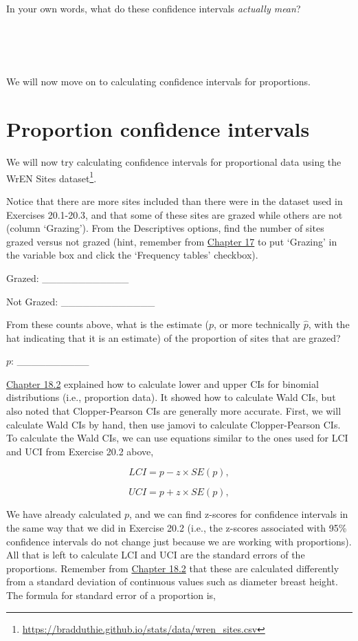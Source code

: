 \documentclass[
  openany]{scrbook}
\begin{document}
In your own words, what do these confidence intervals \emph{actually mean}?

\begin{verbatim}




\end{verbatim}

We will now move on to calculating confidence intervals for proportions.

\hypertarget{proportion-confidence-intervals}{%
\section{Proportion confidence intervals}\label{proportion-confidence-intervals}}

We will now try calculating confidence intervals for proportional data using the WrEN Sites dataset\footnote{\url{https://bradduthie.github.io/stats/data/wren_sites.csv}}.

Notice that there are more sites included than there were in the dataset used in Exercises 20.1-20.3, and that some of these sites are grazed while others are not (column `Grazing').
From the Descriptives options, find the number of sites grazed versus not grazed (hint, remember from \protect\hyperlink{Chapter_17}{Chapter 17} to put `Grazing' in the variable box and click the `Frequency tables' checkbox).

Grazed: \_\_\_\_\_\_\_\_\_\_\_\_

Not Grazed: \_\_\_\_\_\_\_\_\_\_\_\_\_

From these counts above, what is the estimate (\(p\), or more technically \(\hat{p}\), with the hat indicating that it is an estimate) of the proportion of sites that are grazed?

\(p\): \_\_\_\_\_\_\_\_\_\_

\href{Chapter_18.html\#binomial-distribution-cis}{Chapter 18.2} explained how to calculate lower and upper CIs for binomial distributions (i.e., proportion data).
It showed how to calculate Wald CIs, but also noted that Clopper-Pearson CIs are generally more accurate.
First, we will calculate Wald CIs by hand, then use jamovi to calculate Clopper-Pearson CIs.
To calculate the Wald CIs, we can use equations similar to the ones used for LCI and UCI from Exercise 20.2 above,

\[LCI = p - z \times SE(p),\]

\[UCI = p + z \times SE(p),\]

We have already calculated \(p\), and we can find z-scores for confidence intervals in the same way that we did in Exercise 20.2 (i.e., the z-scores associated with 95\% confidence intervals do not change just because we are working with proportions).
All that is left to calculate LCI and UCI are the standard errors of the proportions.
Remember from \href{Chapter_18.html\#binomial-distribution-cis}{Chapter 18.2} that these are calculated differently from a standard deviation of continuous values such as diameter breast height.
The formula for standard error of a proportion is,
\end{document}
